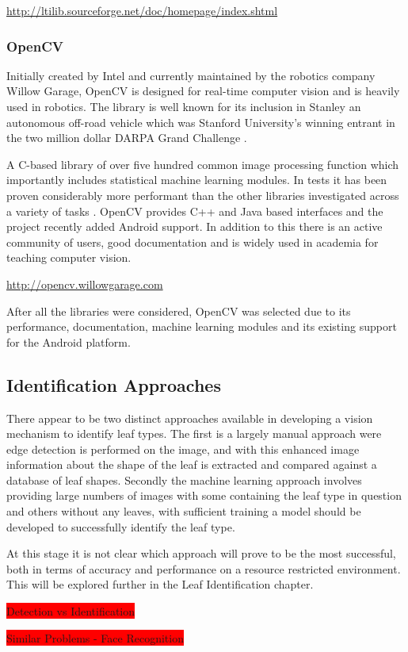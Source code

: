 \url{http://ltilib.sourceforge.net/doc/homepage/index.shtml}


\subsubsection{OpenCV}
Initially created by Intel and currently maintained by the robotics company Willow Garage, OpenCV is designed for real-time computer vision and is heavily used in robotics. The library is well known for its inclusion in Stanley an autonomous off-road vehicle which was Stanford University's winning entrant in the two million dollar DARPA Grand Challenge \cite{openCV11}. 

A C-based library of over five hundred common image processing function which importantly includes statistical machine learning modules. In tests it has been proven considerably more performant than the other libraries investigated across a variety of tasks \cite{utkarsh10}. OpenCV provides C++ and Java based interfaces and the project recently added Android support. In addition to this there is an active community of users, good documentation and is widely used in academia for teaching computer vision.

\url{http://opencv.willowgarage.com}

After all the libraries were considered, OpenCV was selected due to its performance, documentation, machine learning modules and its existing support for the Android platform.

\subsection{Identification Approaches}

There appear to be two distinct approaches available in developing a vision mechanism to identify leaf types. The first is a largely manual approach were edge detection is performed on the image, and with this enhanced image information about the shape of the leaf is extracted and compared against a database of leaf shapes. Secondly the machine learning approach involves providing large numbers of images with some containing the leaf type in question and others without any leaves, with sufficient training a model should be developed to successfully identify the leaf type.

At this stage it is not clear which approach will prove to be the most successful, both in terms of accuracy and performance on a resource restricted environment. This will be explored further in the Leaf Identification chapter.

\colorbox{red}{Detection vs Identification}

\colorbox{red}{Similar Problems - Face Recognition}

